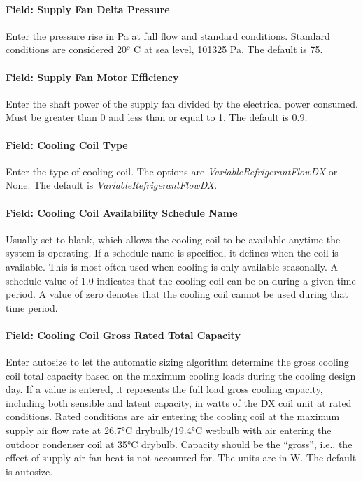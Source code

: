 \paragraph{Field: Supply Fan Delta Pressure}\label{field-supply-fan-delta-pressure-3}

Enter the pressure rise in Pa at full flow and standard conditions. Standard conditions are considered 20\(^{o}\) C at sea level, 101325 Pa. The default is 75.

\paragraph{Field: Supply Fan Motor Efficiency}\label{field-supply-fan-motor-efficiency-4}

Enter the shaft power of the supply fan divided by the electrical power consumed. Must be greater than 0 and less than or equal to 1. The default is 0.9.

\paragraph{Field: Cooling Coil Type}\label{field-cooling-coil-type-4}

Enter the type of cooling coil. The options are \emph{VariableRefrigerantFlowDX} or None. The default is \emph{VariableRefrigerantFlowDX}.

\paragraph{Field: Cooling Coil Availability Schedule Name}\label{field-cooling-coil-availability-schedule-name-3}

Usually set to blank, which allows the cooling coil to be available anytime the system is operating. If a schedule name is specified, it defines when the coil is available. This is most often used when cooling is only available seasonally. A schedule value of 1.0 indicates that the cooling coil can be on during a given time period. A value of zero denotes that the cooling coil cannot be used during that time period.

\paragraph{Field: Cooling Coil Gross Rated Total Capacity}\label{field-cooling-coil-gross-rated-total-capacity-3}

Enter autosize to let the automatic sizing algorithm determine the gross cooling coil total capacity based on the maximum cooling loads during the cooling design day. If a value is entered, it represents the full load gross cooling capacity, including both sensible and latent capacity, in watts of the DX coil unit at rated conditions. Rated conditions are air entering the cooling coil at the maximum supply air flow rate at 26.7°C drybulb/19.4°C wetbulb with air entering the outdoor condenser coil at 35°C drybulb. Capacity should be the ``gross'', i.e., the effect of supply air fan heat is not accounted for. The units are in W. The default is autosize.

